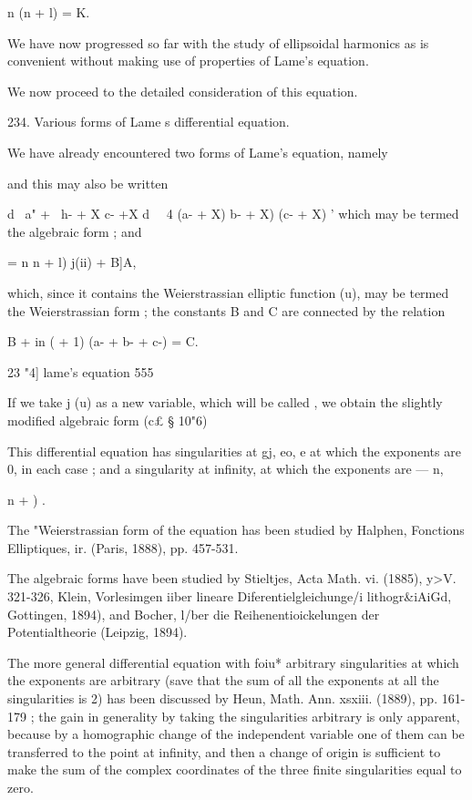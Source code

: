 {{{n (n + l) = K.

We have now progressed so far with the study of ellipsoidal harmonics
as is convenient without making use of properties of Lame's equation.

We now proceed to the detailed consideration of this equation.

234. Various forms of Lame s differential equation.

We have already encountered two forms of Lame's equation, namely

and this may also be written

d \ a" + \ h- + X c- +X d\ ~ 4 (a- + X) b- + X) (c- + X) ' which may
be termed the algebraic form ; and

  = n n + l) j(ii) + B]A,

which, since it contains the Weierstrassian elliptic function (u), may
be termed the Weierstrassian form ; the constants B and C are
connected by the relation

B + in ( + 1) (a- + b- + c-) = C.



23 "4] lame's equation 555

If we take j (u) as a new variable, which will be called , we obtain
the slightly modified algebraic form (c£ § 10"6)

This differential equation has singularities at gj, eo, e at which the
exponents are 0, in each case ; and a singularity at infinity, at
which the exponents are — n,\ \ {n + ) .

The "Weierstrassian form of the equation has been studied by Halphen,
Fonctions Elliptiques, ir. (Paris, 1888), pp. 457-531.

The algebraic forms have been studied by Stieltjes, Acta Math. vi.
(1885), y>V. 321-326, Klein, Vorlesimgen iiber lineare
Diferentielgleichunge/i lithogr\&iAiGd, Gottingen, 1894), and Bocher,
l/ber die Reihenentioickelungen der Potentialtheorie (Leipzig, 1894).

The more general differential equation with foiu* arbitrary
singularities at which the exponents are arbitrary (save that the sum
of all the exponents at all the singularities is 2) has been discussed
by Heun, Math. Ann. xsxiii. (1889), pp. 161-179 ; the gain in
generality by taking the singularities arbitrary is only apparent,
because by a homographic change of the independent variable one of
them can be transferred to the point at infinity, and then a change of
origin is sufficient to make the sum of the complex coordinates of the
three finite singularities equal to zero.

}}}}
